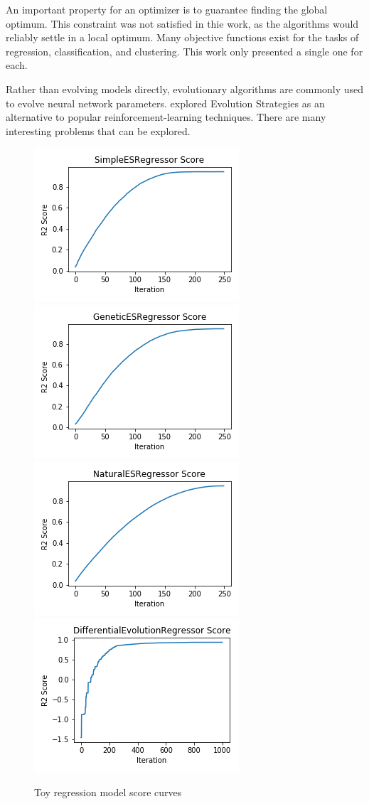 \documentclass[conference]{IEEEtran}
\begin{document}
An important property for an optimizer is to guarantee finding the global optimum. This constraint was not satisfied in thie work, as the algorithms 
would reliably settle in a local optimum. Many objective functions exist for the tasks of regression, classification, and clustering. 
This work only presented a single one for each. 

Rather than evolving models directly, evolutionary algorithms are commonly used to evolve neural network parameters. \cite{openai} explored Evolution 
Strategies as an alternative to popular reinforcement-learning techniques. There are many interesting problems that can be explored. 




\appendix

\begin{figure}[htbp]
\centering
\includegraphics[width=.4\textwidth]{Toy-SimpleESRegressor-ScoreCurve.png}
\includegraphics[width=.4\textwidth]{Toy-GeneticESRegressor-ScoreCurve.png}
\includegraphics[width=.4\textwidth]{Toy-NaturalESRegressor-ScoreCurve.png}
\includegraphics[width=.4\textwidth]{Toy-DifferentialEvolutionRegressor-ScoreCurve.png}
\caption{Toy regression model score curves}
\label{plot:toy-score}
\end{figure}
\end{document}
